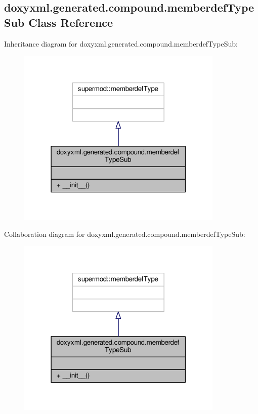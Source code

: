 \subsection{doxyxml.\+generated.\+compound.\+memberdef\+Type\+Sub Class Reference}
\label{classdoxyxml_1_1generated_1_1compound_1_1memberdefTypeSub}


Inheritance diagram for doxyxml.\+generated.\+compound.\+memberdef\+Type\+Sub\+:
\nopagebreak
\begin{figure}[H]
\begin{center}
\leavevmode
\includegraphics[width=279pt]{dd/d93/classdoxyxml_1_1generated_1_1compound_1_1memberdefTypeSub__inherit__graph}
\end{center}
\end{figure}


Collaboration diagram for doxyxml.\+generated.\+compound.\+memberdef\+Type\+Sub\+:
\nopagebreak
\begin{figure}[H]
\begin{center}
\leavevmode
\includegraphics[width=279pt]{d6/d62/classdoxyxml_1_1generated_1_1compound_1_1memberdefTypeSub__coll__graph}
\end{center}
\end{figure}

